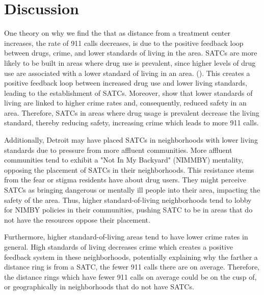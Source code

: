 \documentclass[12pt]{article}
\begin{document}

\section{Discussion}
\label{sec:discussion}

One theory on why we find the that as distance from a treatment center increases, the rate of 911 calls decreases, is due to the positive feedback loop between drugs, crime, and lower standards of living in the area. SATCs are more likely to be built in areas where drug use is prevalent, since higher levels of drug use are associated with a lower standard of living in an area. (\cite{drugs_and_crime}). This creates a positive feedback loop between increased drug use and lower living standards, leading to the establishment of SATCs. Moreover, \cite{drugs_and_crime} show that lower standards of living are linked to higher crime rates and, consequently, reduced safety in an area. Therefore, SATCs in areas where drug usage is prevalent decrease the living standard, thereby reducing safety, increasing crime which leads to more 911 calls.  

Additionally, Detroit may have placed SATCs in neighborhoods with lower living standards due to pressure from more affluent communities. More affluent communities tend to exhibit a "Not In My Backyard" (NIMMBY) mentality, opposing the placement of SATCs in their neighborhoods. This resistance stems from the fear or stigma residents have about drug users. They might perceive SATCs as bringing dangerous or mentally ill people into their area, impacting the safety of the area. Thus, higher standard-of-living neighborhoods tend to lobby for NIMBY policies in their communities, pushing SATC to be in areas that do not have the resources oppose their placement.

Furthermore, higher standard-of-living areas tend to have lower crime rates in general. High standards of living decreases crime which creates a positive feedback system in these neighborhoods, potentially explaining why the farther a distance ring is from a SATC, the fewer 911 calls there are on average. Therefore, the distance rings which have fewer 911 calls on average could be on the cusp of, or geographically in neighborhoods that do not have SATCs. 
    
\end{document}
